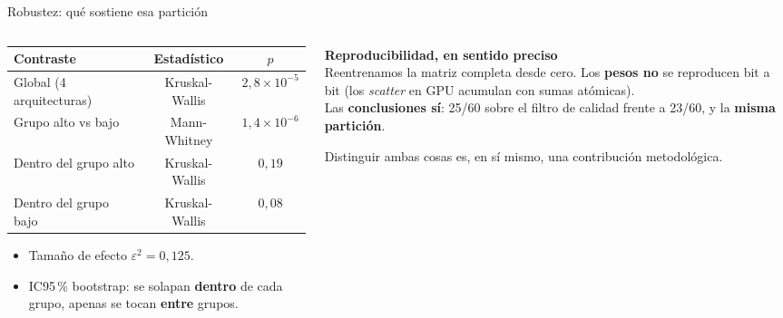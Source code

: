 \documentclass[aspectratio=169,10pt]{beamer}
\begin{document}
\begin{frame}{Robustez: qué sostiene esa partición}
\begin{columns}[T]
\begin{column}{0.54\textwidth}
\footnotesize
\begin{tabular}{lcc}
\toprule
\textbf{Contraste} & \textbf{Estadístico} & \textbf{$p$} \\
\midrule
Global (4 arquitecturas) & Kruskal-Wallis & $2{,}8\!\times\!10^{-5}$ \\
Grupo alto vs bajo & Mann-Whitney & $1{,}4\!\times\!10^{-6}$ \\
\midrule
Dentro del grupo alto & Kruskal-Wallis & $0{,}19$ \\
Dentro del grupo bajo & Kruskal-Wallis & $0{,}08$ \\
\bottomrule
\end{tabular}
\vspace{7pt}
\begin{itemize}\footnotesize
  \item Tamaño de efecto $\varepsilon^2 = 0{,}125$.
  \item IC95\,\% bootstrap: se solapan \textbf{dentro} de cada grupo, apenas se tocan \textbf{entre} grupos.
\end{itemize}
\end{column}
\begin{column}{0.44\textwidth}
\begin{block}{}
\footnotesize
\textbf{Reproducibilidad, en sentido preciso}\\[3pt]
Reentrenamos la matriz completa desde cero. Los \textbf{pesos no} se reproducen bit a bit (los \textit{scatter} en GPU acumulan con sumas atómicas).\\[4pt]
Las \textbf{conclusiones sí}: 25/60 sobre el filtro de calidad frente a 23/60, y la \textbf{misma partición}.
\end{block}
\vspace{2pt}
{\footnotesize\color{muted} Distinguir ambas cosas es, en sí mismo, una contribución metodológica.}
\end{column}
\end{columns}
\end{frame}
\end{document}
